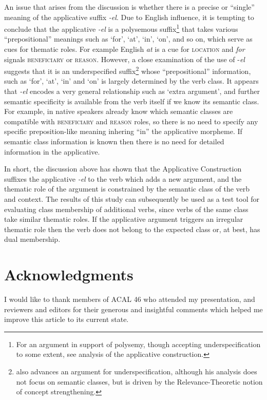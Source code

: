 \documentclass[output=paper]{langsci/langscibook}
\begin{document}
 An issue that arises from the discussion is whether there is a precise or “single” meaning of the applicative suffix \textit{-el}. Due to English influence, it is tempting to conclude that the applicative \textit{-el} is a polysemous suffix\footnote{For an argument in support of polysemy, though accepting underspecification to some extent, see  analysis of the  applicative construction.} that takes various “prepositional” meanings such as ‘for’, ‘at’, ‘in’, ‘on’, and so on, which serve as cues for thematic roles. For example English \textit{at} is a cue for \textsc{location} and \textit{for} signals \textsc{beneficiary} or \textsc{reason}. However, a close examination of the use of -\textit{el} suggests that it is an underspecified suffix\footnote{\citet{Marten2002} also advances an argument for underspecification, although his analysis does not focus on semantic classes, but is driven by the Relevance-Theoretic notion of concept strengthening.} whose “prepositional” information, such as ‘for’, ‘at’, ‘in’ and ‘on’ is largely determined by the verb class. It appears that \textit{-el} encodes a very general relationship such as ‘extra argument’, and further semantic specificity is available from the verb itself if we know its semantic class. For example, in  native speakers already know which semantic classes are compatible with \textsc{beneficiary} and \textsc{reason} roles, so there is no need to specify any specific preposition-like meaning inhering “in” the applicative morpheme. If semantic class information is known then there is no need for detailed information in the applicative. 

 In short, the discussion above has shown that the  Applicative Construction suffixes the applicative \textit{-el} to the verb which adds a new argument, and the thematic role of the argument is constrained by the semantic class of the verb and context. The results of this study can subsequently be used as a test tool for evaluating class membership of additional verbs, since verbs of the same class take similar thematic roles. If the applicative argument triggers an irregular thematic role then the verb does not belong to the expected class or, at best, has dual membership.

\section*{Acknowledgments}

I would like to thank members of ACAL 46 who attended my presentation, and reviewers and editors for their generous and insightful comments which helped me improve this article to its current state.
\end{document}
